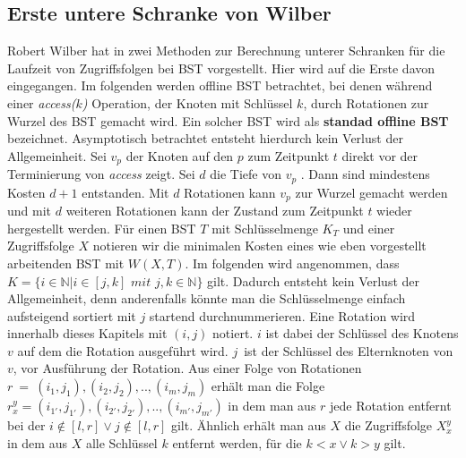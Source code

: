 \documentclass[a4paper,12pt]{article}
\begin{document}
\subsection{Erste untere Schranke von Wilber} \label{wilberBound}
Robert Wilber hat in \cite{wilberLowerBounds} zwei Methoden zur Berechnung unterer Schranken für die Laufzeit von Zugriffsfolgen bei BST vorgestellt. Hier wird auf die Erste davon eingegangen. Im folgenden werden offline BST betrachtet, bei denen während einer \textit{access($k$)} Operation, der Knoten mit Schlüssel $k$, durch Rotationen zur Wurzel des BST gemacht wird. Ein solcher BST wird als \textbf{standad offline BST} bezeichnet. Asymptotisch betrachtet entsteht hierdurch kein Verlust der Allgemeinheit. Sei $v_p$ der Knoten auf den $p$ zum Zeitpunkt $t$ direkt vor der Terminierung von \textit{access} zeigt. Sei $d$ die Tiefe von $v_p$ . Dann sind mindestens Kosten $d + 1$ entstanden. Mit $d$ Rotationen kann $v_p$ zur Wurzel gemacht werden und mit $d$ weiteren Rotationen kann der Zustand zum Zeitpunkt $t$ wieder hergestellt werden.
Für einen BST $T$ mit Schlüsselmenge $K_T$ und einer Zugriffsfolge $X$ notieren wir die minimalen Kosten eines wie eben vorgestellt arbeitenden BST mit $W(X, T)$. Im folgenden wird angenommen, dass 
$K = \{  i \in \mathbb{N} \vert i \in \left[j,k\right] \textit{ mit } j,k \in  \mathbb{N} \} $ gilt. Dadurch entsteht kein Verlust der Allgemeinheit, denn anderenfalls könnte man die Schlüsselmenge einfach aufsteigend sortiert mit $j$ startend durchnummerieren. Eine Rotation wird innerhalb dieses Kapitels mit $\left(i, j\right)$ notiert. $i$ ist dabei der Schlüssel des Knotens $v$ auf dem die Rotation ausgeführt wird. $j$~ist der Schlüssel des Elternknoten von $v$, vor Ausführung der Rotation. Aus einer Folge von Rotationen $r~=~\left(i_1,j_1 \right),\left(i_2,j_2 \right),..,\left(i_m,j_m \right)$ erhält man die Folge  $r^y_x = \left(i_{1'},j_{1'}\right),\left(i_{2'},j_{2'} \right),..,\left(i_{m'},j_{m'} \right)$  in dem man aus $r$ jede Rotation entfernt bei der $i\notin \left[l,r\right] \lor j\notin \left[l,r\right]$ gilt. Ähnlich erhält man aus $X$ die Zugriffsfolge $X^y_x$ in dem aus $X$ alle Schlüssel $k$ entfernt werden, für die $k < x  \lor k > y$ gilt.
\end{document}

